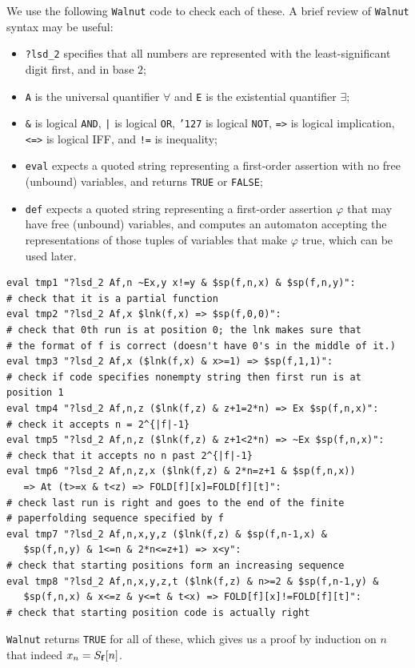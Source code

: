 \documentclass[12pt,reqno]{article}
\begin{document}
We use the following {\tt Walnut} code to check each of these.  A brief
review of {\tt Walnut} syntax may be useful:
\begin{itemize}
\item {\tt ?lsd\_2} specifies that all numbers are represented with the
least-significant digit first, and in base $2$;
\item {\tt A} is the universal quantifier $\forall$ and {\tt E} is the existential quantifier $\exists$;
\item {\tt \&} is logical {\tt AND}, {\tt |} is logical {\tt OR}, {\tt \char'127} is logical {\tt NOT},
{\tt =>} is logical implication, {\tt <=>} is logical IFF, and
{\tt !=} is inequality;
\item {\tt eval} expects a quoted string representing a first-order assertion
with no free (unbound) variables, and returns {\tt TRUE} or {\tt FALSE};
\item {\tt def} expects a quoted string representing a first-order assertion
$\varphi$
that may have free (unbound) variables, and computes an automaton accepting
the representations of those tuples of variables that make $\varphi$ true,
which can be used later.
\end{itemize}
\begin{verbatim}
eval tmp1 "?lsd_2 Af,n ~Ex,y x!=y & $sp(f,n,x) & $sp(f,n,y)":
# check that it is a partial function
eval tmp2 "?lsd_2 Af,x $lnk(f,x) => $sp(f,0,0)":
# check that 0th run is at position 0; the lnk makes sure that
# the format of f is correct (doesn't have 0's in the middle of it.)
eval tmp3 "?lsd_2 Af,x ($lnk(f,x) & x>=1) => $sp(f,1,1)":
# check if code specifies nonempty string then first run is at position 1
eval tmp4 "?lsd_2 Af,n,z ($lnk(f,z) & z+1=2*n) => Ex $sp(f,n,x)":
# check it accepts n = 2^{|f|-1}
eval tmp5 "?lsd_2 Af,n,z ($lnk(f,z) & z+1<2*n) => ~Ex $sp(f,n,x)":
# check that it accepts no n past 2^{|f|-1}
eval tmp6 "?lsd_2 Af,n,z,x ($lnk(f,z) & 2*n=z+1 & $sp(f,n,x)) 
   => At (t>=x & t<z) => FOLD[f][x]=FOLD[f][t]":
# check last run is right and goes to the end of the finite
# paperfolding sequence specified by f
eval tmp7 "?lsd_2 Af,n,x,y,z ($lnk(f,z) & $sp(f,n-1,x) & 
   $sp(f,n,y) & 1<=n & 2*n<=z+1) => x<y":
# check that starting positions form an increasing sequence
eval tmp8 "?lsd_2 Af,n,x,y,z,t ($lnk(f,z) & n>=2 & $sp(f,n-1,y) &
   $sp(f,n,x) & x<=z & y<=t & t<x) => FOLD[f][x]!=FOLD[f][t]":
# check that starting position code is actually right
\end{verbatim}

{\tt Walnut} returns {\tt TRUE} for all of these, which gives us a proof by
induction on $n$ that indeed $x_n = S_{\bf f}[n]$.  
\end{document}
